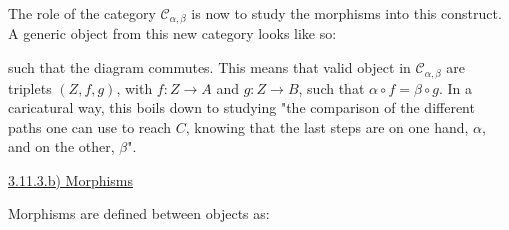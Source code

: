 
The role of the category $\mathcal{C}_{\alpha, \beta}$ is now to study the morphisms into this construct. A generic object from this new category looks like so:


such that the diagram commutes. This means that valid object in $\mathcal{C}_{\alpha, \beta}$ are triplets $(Z, f, g)$, with $f : Z \to A$ and $g : Z \to B$, such that $\alpha \circ f = \beta \circ g$. In a caricatural way, this boils down to studying "the comparison of the different paths one can use to reach $C$, knowing that the last steps are on one hand, $\alpha$, and on the other, $\beta$".

\vspace{5mm}
\underline{3.11.3.b) Morphisms}

Morphisms are defined between objects as:

